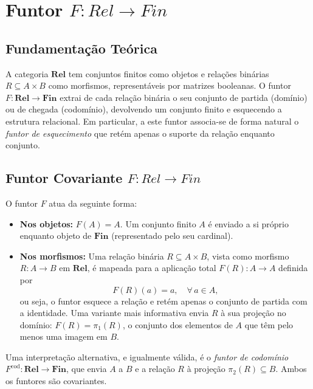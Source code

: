 \section{Funtor $F: Rel \to Fin$}
\label{sec:functor-rel-fin}

\subsection{Fundamentação Teórica}

A categoria $\mathbf{Rel}$ tem conjuntos finitos como objetos e relações binárias $R \subseteq A \times B$ como morfismos, representáveis por matrizes booleanas. O funtor $F: \mathbf{Rel} \to \mathbf{Fin}$ extrai de cada relação binária o seu conjunto de partida (domínio) ou de chegada (codomínio), devolvendo um conjunto finito e esquecendo a estrutura relacional. Em particular, a este funtor associa-se de forma natural o \emph{funtor de esquecimento} que retém apenas o suporte da relação enquanto conjunto.

\subsection{Funtor Covariante $F: Rel \to Fin$}

\begin{definition}
O funtor $F$ atua da seguinte forma:
\begin{itemize}
    \item \textbf{Nos objetos:} $F(A) = A$. Um conjunto finito $A$ é enviado a si próprio enquanto objeto de $\mathbf{Fin}$ (representado pelo seu cardinal).
    \item \textbf{Nos morfismos:} Uma relação binária $R \subseteq A \times B$, vista como morfismo $R: A \to B$ em $\mathbf{Rel}$, é mapeada para a aplicação total $F(R): A \to A$ definida por
    \[
        F(R)(a) = a, \quad \forall\, a \in A,
    \]
    ou seja, o funtor esquece a relação e retém apenas o conjunto de partida com a identidade. Uma variante mais informativa envia $R$ à sua projeção no domínio: $F(R) = \pi_1(R)$, o conjunto dos elementos de $A$ que têm pelo menos uma imagem em $B$.
\end{itemize}
\end{definition}

\begin{remark}
Uma interpretação alternativa, e igualmente válida, é o \emph{funtor de codomínio} $F^{\mathrm{cod}}: \mathbf{Rel} \to \mathbf{Fin}$, que envia $A$ a $B$ e a relação $R$ à projeção $\pi_2(R) \subseteq B$. Ambos os funtores são covariantes.
\end{remark}

